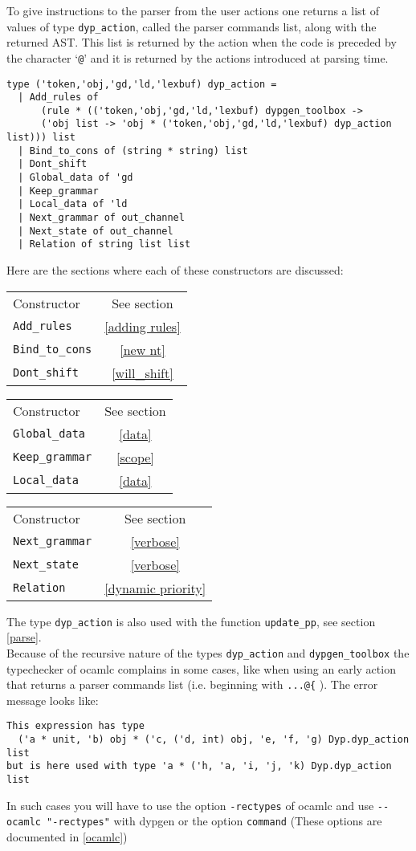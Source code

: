 \documentclass[12pt]{article}
\begin{document}
{To give instructions to the parser from the user actions one returns a list of values of type \verb|dyp_action|, called the parser commands list, along with the returned AST. This list is returned by the action when the code is preceded by the character `\verb|@|' and it is returned by the actions introduced at parsing time.
\begin{verbatim}
type ('token,'obj,'gd,'ld,'lexbuf) dyp_action =
  | Add_rules of
      (rule * (('token,'obj,'gd,'ld,'lexbuf) dypgen_toolbox ->
      ('obj list -> 'obj * ('token,'obj,'gd,'ld,'lexbuf) dyp_action list))) list
  | Bind_to_cons of (string * string) list
  | Dont_shift
  | Global_data of 'gd
  | Keep_grammar
  | Local_data of 'ld
  | Next_grammar of out_channel
  | Next_state of out_channel
  | Relation of string list list
\end{verbatim}

Here are the sections where each of these constructors are discussed:

\begin{center}
\begin{tabular}{lc}
  Constructor & See section\\
  \verb|Add_rules|&\ref{adding rules}\\
  \verb|Bind_to_cons|&\ref{new nt}\\
  \verb|Dont_shift|&\ref{will_shift}
\end{tabular}
\begin{tabular}{lc}
  Constructor & See section\\
  \verb|Global_data|&\ref{data}\\
  \verb|Keep_grammar|&\ref{scope}\\
  \verb|Local_data|&\ref{data}
\end{tabular}
\begin{tabular}{lc}
  Constructor & See section\\
  \verb|Next_grammar|&\ref{verbose}\\
  \verb|Next_state|&\ref{verbose}\\
  \verb|Relation|&\ref{dynamic priority}\\
\end{tabular}
\end{center}

The type \verb|dyp_action| is also used with the function \verb|update_pp|, see section \ref{parse}.\\

Because of the recursive nature of the types \verb|dyp_action| and \verb|dypgen_toolbox| the typechecker of ocamlc complains in some cases, like when using an early action that returns a parser commands list (i.e. beginning with \verb|...@{| ). The error message looks like:
\begin{verbatim}
This expression has type
  ('a * unit, 'b) obj * ('c, ('d, int) obj, 'e, 'f, 'g) Dyp.dyp_action list
but is here used with type 'a * ('h, 'a, 'i, 'j, 'k) Dyp.dyp_action list
\end{verbatim}
In such cases you will have to use the option \verb|-rectypes| of ocamlc and use \verb|--ocamlc "-rectypes"| with dypgen or the option \verb|command| (These options are documented in \ref{ocamlc})

}
\end{document}
